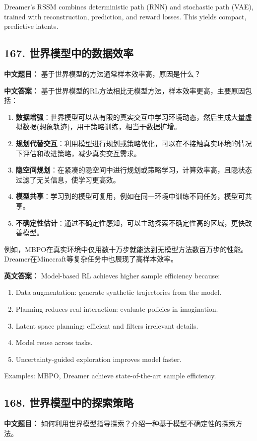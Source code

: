 \documentclass[10pt,a4paper]{ctexart}
\begin{document}
Dreamer's RSSM combines deterministic path (RNN) and stochastic path (VAE), trained with reconstruction, prediction, and reward losses. This yields compact, predictive latents.

\subsection*{167. 世界模型中的数据效率}
\textbf{中文题目：} 基于世界模型的方法通常样本效率高，原因是什么？

\textbf{中文答案：}  
基于世界模型的RL方法相比无模型方法，样本效率更高，主要原因包括：

\begin{enumerate}
    \item \textbf{数据增强}：世界模型可以从有限的真实交互中学习环境动态，然后生成大量虚拟数据(想象轨迹)，用于策略训练，相当于数据扩增。
    \item \textbf{规划代替交互}：利用模型进行规划或策略优化，可以在不接触真实环境的情况下评估和改进策略，减少真实交互需求。
    \item \textbf{隐空间规划}：在紧凑的隐空间中进行规划或策略学习，计算效率高，且隐状态过滤了无关信息，使学习更高效。
    \item \textbf{模型共享}：学习到的模型可复用，例如在同一环境中训练不同任务，模型可共享。
    \item \textbf{不确定性估计}：通过不确定性感知，可以主动探索不确定性高的区域，更快改善模型。
\end{enumerate}

例如，MBPO在真实环境中仅用数十万步就能达到无模型方法数百万步的性能。Dreamer在Minecraft等复杂任务中也展现了高样本效率。

\textbf{英文答案：}  
Model-based RL achieves higher sample efficiency because:
\begin{enumerate}
    \item Data augmentation: generate synthetic trajectories from the model.
    \item Planning reduces real interaction: evaluate policies in imagination.
    \item Latent space planning: efficient and filters irrelevant details.
    \item Model reuse across tasks.
    \item Uncertainty-guided exploration improves model faster.
\end{enumerate}
Examples: MBPO, Dreamer achieve state-of-the-art sample efficiency.

\subsection*{168. 世界模型中的探索策略}
\textbf{中文题目：} 如何利用世界模型指导探索？介绍一种基于模型不确定性的探索方法。
\end{document}
